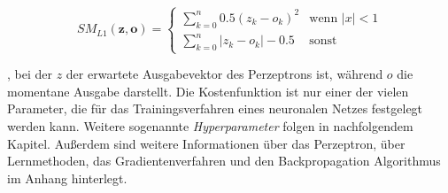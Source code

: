 \begin{equation} \label{smooth}
SM_{L1}(\boldsymbol{z},\boldsymbol{o}) = \begin{cases}
\sum_{k=0}^n 0.5(z_k-o_k)^2      & \text{wenn } |x| < 1\\
\sum_{k=0}^n |z_k-o_k| - 0.5   & \text{sonst}
\end{cases}
\end{equation}

, bei der $z$ der erwartete Ausgabevektor des Perzeptrons ist, während $o$ die momentane Ausgabe darstellt. Die Kostenfunktion ist nur einer der vielen Parameter, die für das Trainingsverfahren eines neuronalen Netzes festgelegt werden kann. Weitere sogenannte \textit{Hyperparameter} folgen in nachfolgendem Kapitel. Außerdem sind weitere Informationen über das Perzeptron, über Lernmethoden, das Gradientenverfahren und den Backpropagation Algorithmus im Anhang hinterlegt.
